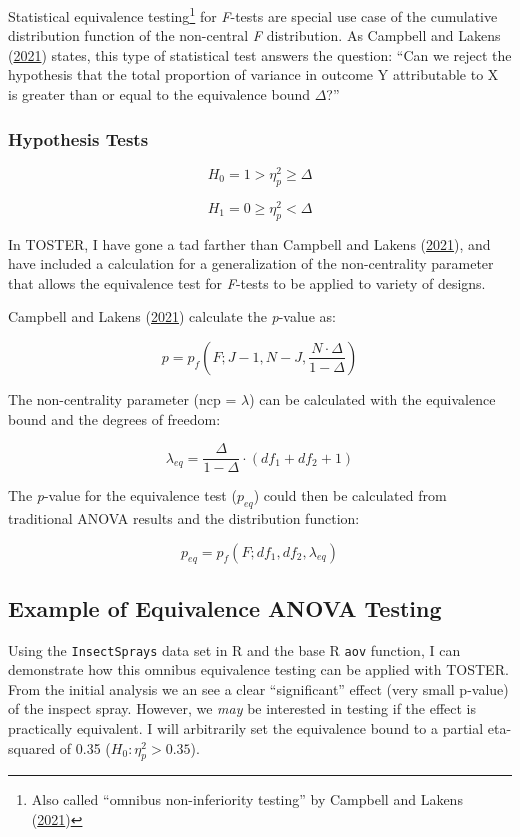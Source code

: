 \documentclass[
]{interact}
\begin{document}
Statistical equivalence testing\footnote{Also called ``omnibus
  non-inferiority testing'' by Campbell and Lakens
  (\protect\hyperlink{ref-Campbell_2021}{2021})} for \emph{F}-tests are
special use case of the cumulative distribution function of the
non-central \emph{F} distribution. As Campbell and Lakens
(\protect\hyperlink{ref-Campbell_2021}{2021}) states, this type of
statistical test answers the question: ``Can we reject the hypothesis
that the total proportion of variance in outcome Y attributable to X is
greater than or equal to the equivalence bound \(\Delta\)?''

\hypertarget{hypothesis-tests}{%
\subsubsection{Hypothesis Tests}\label{hypothesis-tests}}

\[
H_0 =  1 > \eta^2_p \geq \Delta
\]

\[
H_1 =  0 \geq \eta^2_p < \Delta
\]

In TOSTER, I have gone a tad farther than Campbell and Lakens
(\protect\hyperlink{ref-Campbell_2021}{2021}), and have included a
calculation for a generalization of the non-centrality parameter that
allows the equivalence test for \emph{F}-tests to be applied to variety
of designs.

Campbell and Lakens (\protect\hyperlink{ref-Campbell_2021}{2021})
calculate the \emph{p}-value as:

\[
p = p_f(F; J-1, N-J, \frac{N \cdot \Delta}{1-\Delta})
\]

The non-centrality parameter (ncp = \(\lambda\)) can be calculated with
the equivalence bound and the degrees of freedom:

\[
\lambda_{eq} = \frac{\Delta}{1-\Delta} \cdot(df_1 + df_2 +1)
\]

\newpage

The \emph{p}-value for the equivalence test (\(p_{eq}\)) could then be
calculated from traditional ANOVA results and the distribution function:

\[
p_{eq} = p_f(F; df_1, df_2, \lambda_{eq})
\]

\hypertarget{example-of-equivalence-anova-testing}{%
\subsection{Example of Equivalence ANOVA
Testing}\label{example-of-equivalence-anova-testing}}

Using the \texttt{InsectSprays} data set in R and the base R
\texttt{aov} function, I can demonstrate how this omnibus equivalence
testing can be applied with TOSTER. From the initial analysis we an see
a clear ``significant'' effect (very small p-value) of the inspect
spray. However, we \emph{may} be interested in testing if the effect is
practically equivalent. I will arbitrarily set the equivalence bound to
a partial eta-squared of 0.35 (\(H_0: \eta^2_p > 0.35\)).
\end{document}
